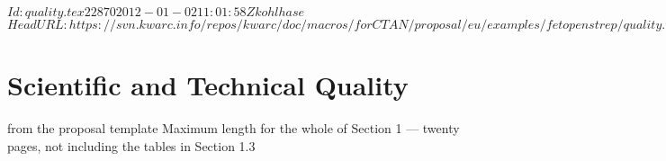 \svnInfo $Id: quality.tex 22870 2012-01-02 11:01:58Z kohlhase $
\svnKeyword $HeadURL: https://svn.kwarc.info/repos/kwarc/doc/macros/forCTAN/proposal/eu/examples/fetopenstrep/quality.tex $
\chapter{Scientific and Technical Quality}\label{chap:quality}
\begin{todo}{from the proposal template}
  Maximum length for the whole of Section 1 –-- twenty pages, not including the tables in
  Section 1.3
\end{todo}





